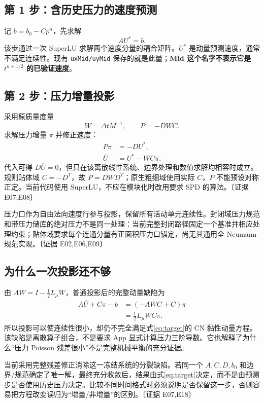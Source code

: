 \documentclass[UTF8,a4paper,11pt,fontset=fandol]{ctexart}
\newcommand{\code}[1]{\nolinkurl{#1}}
\newcommand{\ev}[1]{{\small\color{muted}〔证据 #1〕}}
\newcommand{\dt}{\Delta t}\newcommand{\jump}[1]{[\![#1]\!]}
\begin{document}
\subsection{第 1 步：含历史压力的速度预测}
记 $b=b_0-Cp^n$，先求解
\begin{equation}
 A U^*=b.
 \label{eq:predictor}
\end{equation}
该步通过一次 SuperLU 求解两个速度分量的耦合矩阵。$U^*$ 是动量预测速度，通常不满足连续性。现有 \code{uxMid/uyMid} 保存的就是此量；\textbf{Mid 这个名字不表示它是 $t^{n+1/2}$ 的已验证速度}。

\subsection{第 2 步：压力增量投影}
采用原质量度量
\begin{equation}
 W=\dt M^{-1},\qquad P=-DWC.
\end{equation}
求解压力增量 $\pi$ 并修正速度：
\begin{align}
 P\pi&=-DU^*,\label{eq:poisson}\\
 \overline U&=U^*-WC\pi.\label{eq:project}
\end{align}
代入可得 $D\overline U=0$，但只在该离散线性系统、边界处理和数值求解均相容时成立。规则贴体域 $C=-D^T$，故 $P=DWD^T$；原生粗细域使用实际 $C$，$P$ 不能预设对称正定。当前代码使用 SuperLU，不应在模块化时改用要求 SPD 的算法。\ev{E07,E08}

压力口作为自由法向速度行参与投影，保留所有活动单元连续性。封闭域压力规范和带压力储库的绝对压力不是同一处理：当前完整封闭路径固定一个基准并相应处理约束；贴体域要求每个连通分量有正面积压力口锚定，尚无其通用全 Neumann 规范实现。\ev{E02,E06,E09}

\subsection{为什么一次投影还不够}
由 $AW=I-\tfrac12L_\mu W$，普通投影后的完整动量缺陷为
\begin{align}
 A\overline U+C\pi-b
 &=(-AWC+C)\pi\\
 &=\tfrac12L_\mu WC\pi.\label{eq:splitting}
\end{align}
所以投影可以使连续性很小，却仍不完全满足式\eqref{eq:target}的 CN 黏性动量方程。该缺陷是离散算子组合，不是要求 App 显式计算压力三阶导数。它也解释了为什么“压力 Poisson 残差很小”不是完整机械平衡的充分证据。

当前采用完整残差修正消除这一冻结系统的分裂缺陷。若同一个 $A,C,D,b_0$ 和边界/规范确定了唯一解，最终充分收敛后，结果由式\eqref{eq:target}决定，而不是由预测步是否使用历史压力决定。比较不同时间格式时必须说明是否保留这一步，否则容易把方程改变误归为“增量/非增量”的区别。\ev{E07,E18}
\end{document}
